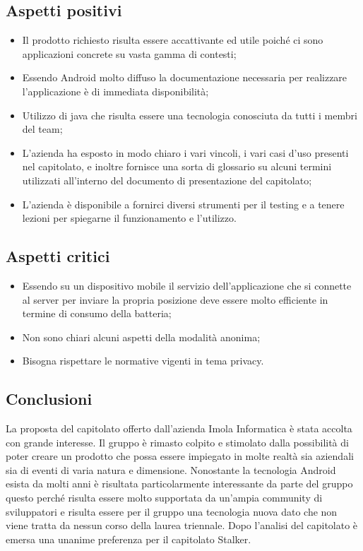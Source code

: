 \subsection{Aspetti positivi}
\begin{itemize}
\item Il prodotto richiesto risulta essere accattivante ed utile poich\'e ci sono applicazioni concrete su vasta gamma di contesti;
\item Essendo Android molto diffuso la documentazione necessaria per realizzare l'applicazione \`e di immediata disponibilit\`a;
\item Utilizzo di java che risulta essere una tecnologia conosciuta da tutti i membri del team;
\item L'azienda ha esposto in modo chiaro i vari vincoli, i vari casi d'uso presenti nel capitolato, e inoltre fornisce una sorta di glossario su alcuni termini utilizzati all'interno del documento di presentazione
del capitolato;
\item L'azienda \`e disponibile a fornirci diversi strumenti per il testing e a tenere lezioni per spiegarne il funzionamento e l'utilizzo.
\end{itemize}
\subsection{Aspetti critici}
\begin{itemize}
\item Essendo su un dispositivo mobile il servizio dell'applicazione che si connette al server per inviare la propria posizione deve essere molto efficiente in termine di consumo della batteria;
\item Non sono chiari alcuni aspetti della modalit\`a anonima;
\item Bisogna rispettare le normative vigenti in tema privacy.
\end{itemize}
\subsection{Conclusioni}
La proposta del capitolato offerto dall'azienda Imola Informatica \`e stata accolta con grande interesse. Il gruppo \`e rimasto colpito e stimolato dalla possibilit\`a di poter creare un prodotto che possa essere impiegato in molte realt\`a sia aziendali sia di eventi di varia natura e dimensione. Nonostante la tecnologia Android esista da molti anni \`e risultata particolarmente interessante da parte del gruppo questo perch\'e risulta essere molto supportata da un'ampia community di sviluppatori e risulta essere per il gruppo una tecnologia nuova dato che non viene tratta da nessun corso della laurea triennale. Dopo l'analisi del capitolato \`e emersa una unanime preferenza per il capitolato Stalker.
